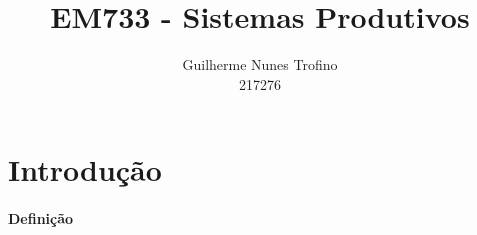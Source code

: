\documentclass{article}
\title{EM733 - Sistemas Produtivos}
\author{Guilherme Nunes Trofino\\217276}
\begin{document}
    \maketitle
\newpage

    \tableofcontents
\newpage

    \section{Introdução}
        \paragraph{Definição}
\end{document}
